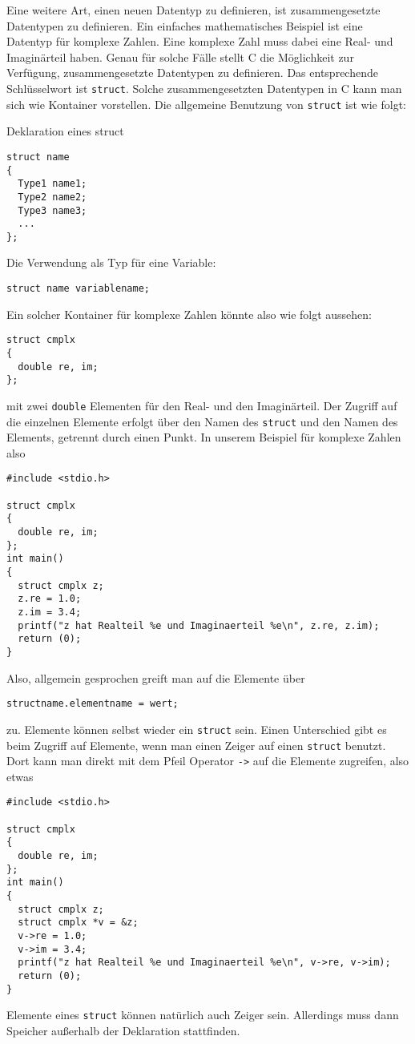 Eine weitere Art, einen neuen Datentyp zu definieren, ist zusammengesetzte Datentypen zu definieren.
Ein einfaches mathematisches Beispiel ist eine Datentyp für komplexe Zahlen.
Eine komplexe Zahl muss dabei eine Real- und Imaginärteil haben.
Genau für solche Fälle stellt C die Möglichkeit zur Verfügung, zusammengesetzte Datentypen zu definieren.
Das entsprechende Schlüsselwort ist \verb|struct|.
Solche zusammengesetzten Datentypen in C kann man sich wie Kontainer vorstellen.
Die allgemeine Benutzung von \verb|struct| ist wie folgt:
\begin{myalertblock}{Deklaration eines struct}
  \begin{lstlisting}
struct name
{
  Type1 name1;
  Type2 name2;
  Type3 name3;
  ...
};
  \end{lstlisting}
  \vspace{-0.4cm}
  Die Verwendung als Typ für eine Variable:
  \begin{lstlisting}
struct name variablename;
  \end{lstlisting}
  \vspace{-0.4cm} 
\end{myalertblock}
Ein solcher Kontainer für komplexe Zahlen könnte also wie folgt aussehen:
\begin{lstlisting}
struct cmplx
{
  double re, im;
};
\end{lstlisting}
mit zwei \verb|double| Elementen für den Real- und den Imaginärteil. 
Der Zugriff auf die einzelnen Elemente erfolgt über den Namen des \verb|struct| und den Namen des Elements, getrennt durch einen Punkt.
In unserem Beispiel für komplexe Zahlen also 
\begin{lstlisting}
#include <stdio.h>

struct cmplx
{
  double re, im;
};
int main()
{
  struct cmplx z;
  z.re = 1.0;
  z.im = 3.4;
  printf("z hat Realteil %e und Imaginaerteil %e\n", z.re, z.im);
  return (0);
}
\end{lstlisting}
Also, allgemein gesprochen greift man auf die Elemente über 
\begin{lstlisting}
structname.elementname = wert;
\end{lstlisting}
zu.
Elemente können selbst wieder ein \verb|struct| sein.
Einen Unterschied gibt es beim Zugriff auf Elemente, wenn man einen Zeiger auf einen \verb|struct| benutzt.
Dort kann man direkt mit dem Pfeil Operator \verb|->| auf die Elemente zugreifen, also etwas
\begin{lstlisting}
#include <stdio.h>

struct cmplx
{
  double re, im;
};
int main()
{
  struct cmplx z;
  struct cmplx *v = &z;
  v->re = 1.0;
  v->im = 3.4;
  printf("z hat Realteil %e und Imaginaerteil %e\n", v->re, v->im);
  return (0);
}
\end{lstlisting}
Elemente eines \verb|struct| können natürlich auch Zeiger sein.
Allerdings muss dann Speicher außerhalb der Deklaration stattfinden.

